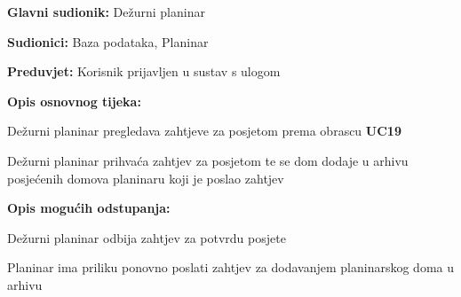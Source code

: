 		\noindent {}
		\begin{packed_item}
			
			\item \textbf{Glavni sudionik: }$ $Dežurni planinar$ $
			\item  \textbf{Sudionici:} $ $Baza podataka, Planinar$ $
			\item  \textbf{Preduvjet:} $ $Korisnik prijavljen u sustav s ulogom $ $
			\item  \textbf{Opis osnovnog tijeka:}
			
			\item[] \begin{packed_enum}
				
				\item $ $Dežurni planinar pregledava zahtjeve za posjetom prema obrascu \textbf{UC19} $ $
				\item $ $Dežurni planinar prihvaća zahtjev za posjetom te se dom dodaje u arhivu posjećenih domova planinaru koji je poslao zahtjev$ $

			\end{packed_enum}
			\item  \textbf{Opis mogućih odstupanja:}
			
			\item[] \begin{packed_item}
				
				\item[1.a] $ $Dežurni planinar odbija zahtjev za potvrdu posjete$ $
				\item[] \begin{packed_enum}
					\item $ $Planinar ima priliku ponovno poslati zahtjev za dodavanjem planinarskog doma u arhivu$ $
				\end{packed_enum}
			\end{packed_item}
		\end{packed_item} 
	
		
		
	
	
